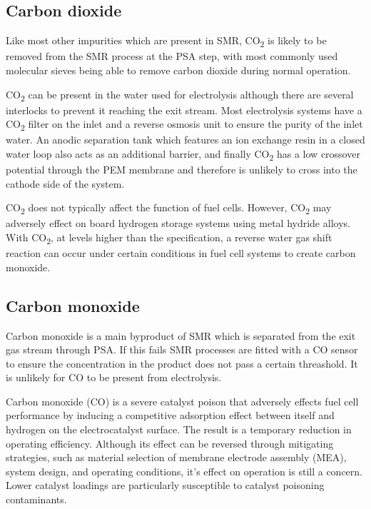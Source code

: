 \subsection*{Carbon dioxide} 
Like most other impurities which are present in SMR, CO\textsubscript{2} is likely to be removed from the SMR process at the PSA step, with most commonly used molecular sieves being able to remove carbon dioxide during normal operation. \cite{Muradov2015} 

CO\textsubscript{2} can be present in the water used for electrolysis although there are several interlocks to prevent it reaching the exit stream. Most electrolysis systems have a CO\textsubscript{2} filter on the inlet and a reverse osmosis unit to ensure the purity of the inlet water. An anodic separation tank which features an ion exchange resin in a closed water loop also acts as an additional barrier, and finally CO\textsubscript{2} has a low crossover potential through the PEM membrane and therefore is unlikely to cross into the cathode side of the system.\cite{Bacquart2018}

CO\textsubscript{2} does not typically affect the function of fuel cells. However, CO\textsubscript{2} may adversely effect on board hydrogen storage systems using metal hydride alloys. With CO\textsubscript{2}, at levels higher than the specification, a reverse water gas shift reaction can occur under certain conditions in fuel cell systems to create carbon monoxide. \cite{InternationalStandardISO14687-2:20122012}


\subsection*{Carbon monoxide}
Carbon monoxide is a main byproduct of SMR which is separated from the exit gas stream through PSA. \cite{Muradov2015} If this fails SMR processes are fitted with a CO sensor to ensure the concentration in the product does not pass a certain threashold. \cite{Bacquart2018} It is unlikely for CO to be present from electrolysis.

Carbon monoxide (CO) is a severe catalyst poison that adversely effects fuel cell performance by inducing a competitive adsorption effect between itself and hydrogen on the electrocatalyst surface. The result is a temporary reduction in operating efficiency. \cite{InternationalStandardISO14687-2:20122012} Although its effect can be reversed through mitigating strategies, such as material selection of membrane electrode assembly (MEA), system design, and operating conditions, it's effect on operation is still a concern. Lower catalyst loadings are particularly susceptible to catalyst poisoning contaminants.

